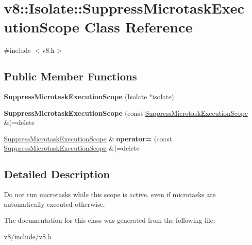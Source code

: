 \hypertarget{classv8_1_1Isolate_1_1SuppressMicrotaskExecutionScope}{}\section{v8\+:\+:Isolate\+:\+:Suppress\+Microtask\+Execution\+Scope Class Reference}
\label{classv8_1_1Isolate_1_1SuppressMicrotaskExecutionScope}


{\ttfamily \#include $<$v8.\+h$>$}

\subsection*{Public Member Functions}
\begin{DoxyCompactItemize}
\item 
\mbox{\label{classv8_1_1Isolate_1_1SuppressMicrotaskExecutionScope_a846d7dd39f4cfad4dfc4c8c785e4a65e}} 
{\bfseries Suppress\+Microtask\+Execution\+Scope} (\mbox{\hyperlink{classv8_1_1Isolate}{Isolate}} $\ast$isolate)
\item 
\mbox{\label{classv8_1_1Isolate_1_1SuppressMicrotaskExecutionScope_ae4d7f51ceab47cabf1f78f65224ca95d}} 
{\bfseries Suppress\+Microtask\+Execution\+Scope} (const \mbox{\hyperlink{classv8_1_1Isolate_1_1SuppressMicrotaskExecutionScope}{Suppress\+Microtask\+Execution\+Scope}} \&)=delete
\item 
\mbox{\label{classv8_1_1Isolate_1_1SuppressMicrotaskExecutionScope_a48038b7c5037f6a329c27ccffef0e71c}} 
\mbox{\hyperlink{classv8_1_1Isolate_1_1SuppressMicrotaskExecutionScope}{Suppress\+Microtask\+Execution\+Scope}} \& {\bfseries operator=} (const \mbox{\hyperlink{classv8_1_1Isolate_1_1SuppressMicrotaskExecutionScope}{Suppress\+Microtask\+Execution\+Scope}} \&)=delete
\end{DoxyCompactItemize}


\subsection{Detailed Description}
Do not run microtasks while this scope is active, even if microtasks are automatically executed otherwise. 

The documentation for this class was generated from the following file\+:\begin{DoxyCompactItemize}
\item 
v8/include/v8.\+h\end{DoxyCompactItemize}
